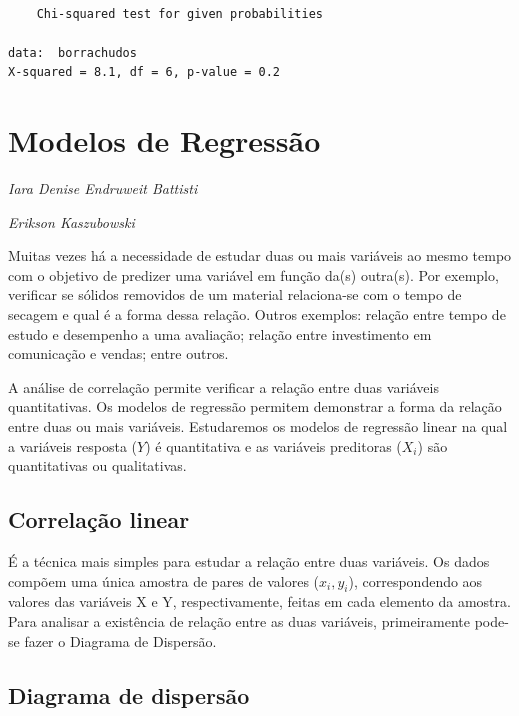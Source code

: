 \documentclass[12pt,portuguese,oneside]{book}
\begin{document}
\begin{verbatim}

    Chi-squared test for given probabilities

data:  borrachudos
X-squared = 8.1, df = 6, p-value = 0.2
\end{verbatim}

\hypertarget{reg}{\chapter{Modelos de Regressão}\label{reg}}

\emph{Iara Denise Endruweit Battisti}

\emph{Erikson Kaszubowski}

\begin{flushright}
\emph{}

\emph{}
\end{flushright}

Muitas vezes há a necessidade de estudar duas ou mais variáveis ao mesmo
tempo com o objetivo de predizer uma variável em função da(s) outra(s).
Por exemplo, verificar se sólidos removidos de um material relaciona-se
com o tempo de secagem e qual é a forma dessa relação. Outros exemplos:
relação entre tempo de estudo e desempenho a uma avaliação; relação
entre investimento em comunicação e vendas; entre outros.

A análise de correlação permite verificar a relação entre duas variáveis
quantitativas. Os modelos de regressão permitem demonstrar a forma da
relação entre duas ou mais variáveis. Estudaremos os modelos de
regressão linear na qual a variáveis resposta (\(Y\)) é quantitativa e
as variáveis preditoras (\(X_i\)) são quantitativas ou qualitativas.

\section{Correlação linear}\label{correlacao-linear}

É a técnica mais simples para estudar a relação entre duas variáveis. Os
dados compõem uma única amostra de pares de valores (\(x_i, y_i\)),
correspondendo aos valores das variáveis X e Y, respectivamente, feitas
em cada elemento da amostra. Para analisar a existência de relação entre
as duas variáveis, primeiramente pode-se fazer o Diagrama de Dispersão.

\section{Diagrama de dispersão}\label{diagrama-de-dispersao}
\end{document}
